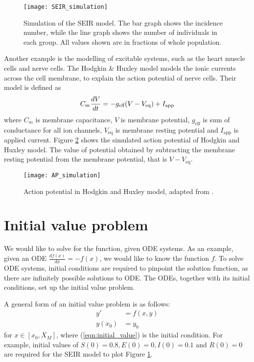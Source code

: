 \begin{figure}
    \texttt{[image: SEIR\_simulation]}
    \caption{Simulation of the SEIR model. The bar graph shows the incidence number, while the line graph shows the number of individuals in each group. All values shown are in fractions of whole population.}
    \label{fig:SEIR_simulation}
\end{figure}

Another example is the modelling of excitable systems, such as the heart muscle cells and nerve cells. The Hodgkin \& Huxley model models the ionic currents across the cell membrane, to explain the action potential of nerve cells\cite{Keener2009}.
Their model is defined as
\begin{equation}
\label{model:HH}
    C_m \frac{dV}{dt} = -g_{\text{eff}}(V - V_{\text{eq}}) + I_{\text{app}} \\
\end{equation}
where $C_m$ is membrane capacitance, $V$ is membrane potential, $g_{\text{eff}}$ is sum of conductance for all ion channels, $V_{\text{eq}}$ is membrane resting potential and $I_{\text{app}}$ is applied current. Figure \ref{fig:AP_simulation} shows the simulated action potential of Hodgkin and Huxley model. The value of potential obtained by subtracting the membrane resting potential from the membrane potential, that is $V - V_{\text{eq}}$.

\begin{figure}
\centering
    \texttt{[image: AP\_simulation]}
    \caption{Action potential in Hodgkin and Huxley model, adapted from \cite{Keener2009}.}
    \label{fig:AP_simulation}
\end{figure}

\section{Initial value problem}
We would like to solve for the function, given ODE systems. As an example, given an ODE $\frac{df(x)}{dx} = -f(x)$, we would like to know the function $f$. To solve ODE systems, initial conditions are required to pinpoint the solution function, as there are infinitely possible solutions to ODE. The ODEs, together with its initial conditions, set up the initial value problem.

A general form of an initial value problem is as follows: 
\begin{align}
    y'&=f(x,y)\\
    y(x_0) &= y_0 \label{eqn:initial_value}
\end{align}
for $x \in [x_0, X_M]$, where (\ref{eqn:initial_value}) is the initial condition. For example, initial values of $S(0)=0.8, E(0)=0, I(0)=0.1$ and $R(0)=0$ are required for the SEIR model to plot Figure \ref{fig:SEIR_simulation}.

